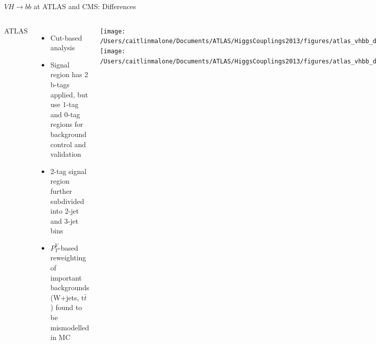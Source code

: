 \documentclass{beamer}
\begin{document}
\begin{frame}{$VH\rightarrow bb$ at ATLAS and CMS: Differences}
	\begin{columns}
		ATLAS
			\begin{itemize} \scriptsize
				\item Cut-based analysis 
				\item Signal region has 2 b-tags applied, but use 1-tag and 0-tag regions for background control and validation
				\item 2-tag signal region further subdivided into 2-jet and 3-jet bins
				\item $P_T^V$-based reweighting of important backgrounds (W+jets, t$\bar t$) found to be mismodelled in MC
			\end{itemize}
			\begin{columns}[c]
					\texttt{[image: /Users/caitlinmalone/Documents/ATLAS/HiggsCouplings2013/figures/atlas\_vhbb\_delta\_phi\_uncorrected.pdf]}
					\texttt{[image: /Users/caitlinmalone/Documents/ATLAS/HiggsCouplings2013/figures/atlas\_vhbb\_delta\_phi\_corrected.pdf]}
			\end{columns}			
		CMS
			\begin{itemize} \scriptsize
				\item B-tagging in trigger allows lower $E_T^{miss}$ thresholds for $Z\rightarrow\nu\nu$ analysis
				\item BDTs trained to distinguish 4 main classes of events: $t\bar{t}$, diboson, Z+jets, VH
				\item Final discriminating variable is the BDT output--look for excess of event relative to background in the most signal-enriched BDT bins
				\item Validation cut-based analysis based on $m_{bb}$ \textcolor{BrickRed}{currently looking into whether there is a sensitivity computed for this analysis}
			\end{itemize}
			\texttt{[image: /Users/caitlinmalone/Documents/ATLAS/HiggsCouplings2013/figures/cms\_vhbb\_mbb\_distribution.pdf]}			
	\end{columns}
\end{frame}
\end{document}
